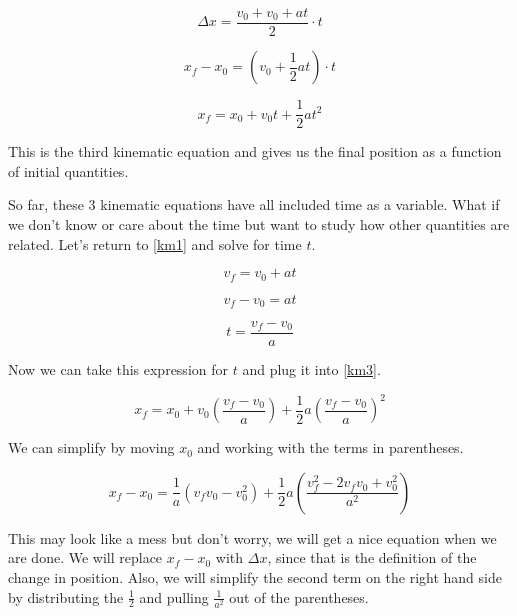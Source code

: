 \documentclass[12pt]{book}
\begin{document}
\begin{equation}
\Delta x = \frac{v_0 + v_0 + at}{2} \cdot t
\end{equation}

\begin{equation}
x_f - x_0 =  (v_0 + \frac{1}{2}at) \cdot t
\end{equation}

\begin{equation}
x_f = x_0 + v_0 t + \frac{1}{2} a t^2
\label{km3}
\end{equation}

This is the third kinematic equation and gives us the final position as a function of initial quantities.

So far, these 3 kinematic equations have all included time as a variable. What if we don't know or care about the time but want to study how other quantities are related. Let's return to \ref{km1} and solve for time $t$.

\begin{equation}
v_f = v_0 + at
\end{equation}

\begin{equation}
v_f - v_0 = at
\end{equation}

\begin{equation}
t = \frac{v_f - v_0}{a}
\end{equation}

Now we can take this expression for $t$ and plug it into \ref{km3}.

\begin{equation}
x_f = x_0 + v_0 \left( \frac{v_f - v_0}{a} \right) + \frac{1}{2} a \left( \frac{v_f - v_0}{a} \right)^2
\end{equation}

We can simplify by moving $x_0$ and working with the terms in parentheses.

\begin{equation}
x_f - x_0 = \frac{1}{a} (v_f v_0 - v_0^2) + \frac{1}{2}a \left( \frac{v_f^2 - 2 v_f v_0 + v_0^2}{a^2} \right)
\end{equation}

This may look like a mess but don't worry, we will get a nice equation when we are done. We will replace $x_f - x_0$ with $\Delta x$, since that is the definition of the change in position. Also, we will simplify the second term on the right hand side by distributing the $\frac{1}{2}$ and pulling $\frac{1}{a^2}$ out of the parentheses.
\end{document}
